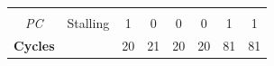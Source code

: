\begin{center}
{{\begin{tabular}{|c|c|c|c|c|c|c|c|}
        \hline
        &  &  &  &  &  &  &  \\
        \thickhline
        \textit{PC} & Stalling & 1 & 0 & 0 & 0 & 1 & 1 \\
        \hline
        \hline
        \thickhline
        \textbf{Cycles} &  & 20 & 21 & 20 & 20 & 81 & 81 \\
        \hline
      \end{tabular}
    }%
  }
  \label{tab:2hour-test-results}
\end{center}